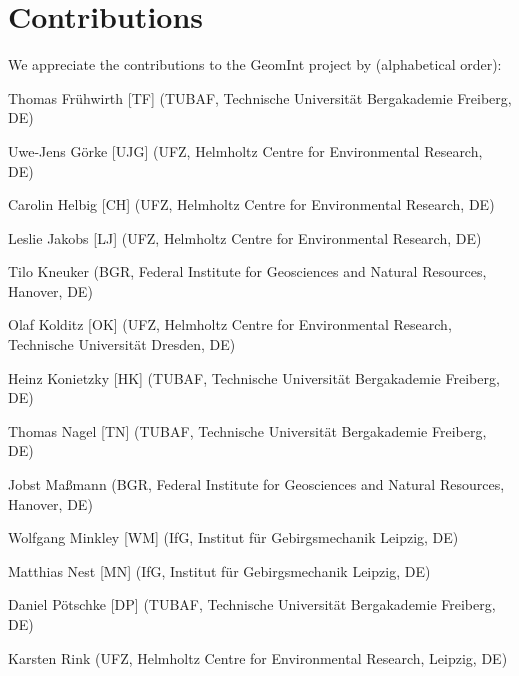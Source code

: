 \chapter*{Contributions}

We appreciate the contributions to the GeomInt project by  (alphabetical order):

\begin{list}{-}{\leftmargin=1em \itemindent=0em \itemsep=0.1em}

\item Thomas Fr\"uhwirth [TF] (TUBAF, Technische Universit\"at Bergakademie Freiberg, DE)	

\item Uwe-Jens G\"orke [UJG] (UFZ, Helmholtz Centre for Environmental Research, DE)	

\item Carolin Helbig [CH] (UFZ, Helmholtz Centre for Environmental Research, DE)	

\item Leslie Jakobs [LJ] (UFZ, Helmholtz Centre for Environmental Research, DE)

\item Tilo Kneuker (BGR, Federal Institute for Geosciences and Natural Resources, Hanover, DE)

\item Olaf Kolditz [OK] (UFZ, Helmholtz Centre for Environmental Research, Technische Universität Dresden, DE) 

\item Heinz Konietzky [HK] (TUBAF, Technische Universit\"at Bergakademie Freiberg, DE)	

\item Thomas Nagel [TN] (TUBAF, Technische Universit\"at Bergakademie Freiberg, DE) 

\item Jobst Ma{\ss}mann (BGR, Federal Institute for Geosciences and Natural Resources, Hanover, DE)

\item Wolfgang Minkley [WM] (IfG, Institut für Gebirgsmechanik Leipzig, DE)	

\item Matthias Nest [MN] (IfG, Institut für Gebirgsmechanik Leipzig, DE)	
\item Daniel P\"otschke [DP] (TUBAF, Technische Universit\"at Bergakademie Freiberg, DE)


\item Karsten Rink (UFZ, Helmholtz Centre for Environmental Research, Leipzig, DE) 


\end{list}
